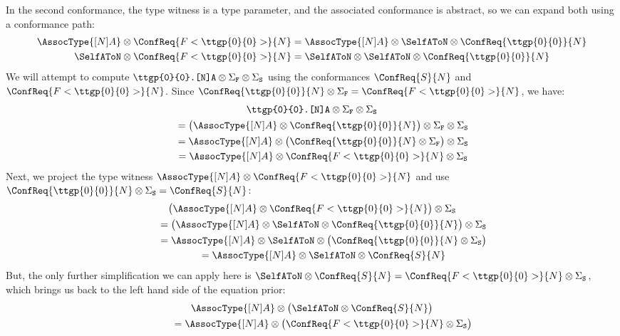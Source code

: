 \documentclass[../generics]{subfiles}
\begin{document}
In the second conformance, the type witness is a type parameter, and the associated conformance is abstract, so we can expand both using a conformance path:
\begin{gather*}
\AssocType{[N]A} \otimes \ConfReq{F<\ttgp{0}{0}>}{N} = \AssocType{[N]A} \otimes \SelfAToN \otimes \ConfReq{\ttgp{0}{0}}{N}\\
\SelfAToN \otimes \ConfReq{F<\ttgp{0}{0}>}{N} = \SelfAToN \otimes \SelfAToN \otimes \ConfReq{\ttgp{0}{0}}{N}
\end{gather*}
We will attempt to compute $\texttt{\ttgp{0}{0}.[N]A}\otimes \Sigma_\texttt{F}\otimes\Sigma_\texttt{S}$ using the conformances $\ConfReq{S}{N}$ and $\ConfReq{F<\ttgp{0}{0}>}{N}$. Since $\ConfReq{\ttgp{0}{0}}{N} \otimes \Sigma_\texttt{F}=\ConfReq{F<\ttgp{0}{0}>}{N}$, we have:
\begin{gather*}
\texttt{\ttgp{0}{0}.[N]A} \otimes \Sigma_\texttt{F}\otimes\Sigma_\texttt{S} \\
\qquad {} = \bigl( \AssocType{[N]A} \otimes \ConfReq{\ttgp{0}{0}}{N} \bigr) \otimes \Sigma_\texttt{F}\otimes\Sigma_\texttt{S}\\
\qquad {} = \AssocType{[N]A} \otimes \bigl( \ConfReq{\ttgp{0}{0}}{N} \otimes \Sigma_\texttt{F} \bigr)\otimes\Sigma_\texttt{S}\\
\qquad {} = \AssocType{[N]A} \otimes \ConfReq{F<\ttgp{0}{0}>}{N} \otimes \Sigma_\texttt{S}
\end{gather*}
Next, we project the type witness $\AssocType{[N]A}\otimes\ConfReq{F<\ttgp{0}{0}>}{N}$ and use $\ConfReq{\ttgp{0}{0}}{N} \otimes \Sigma_\texttt{S}=\ConfReq{S}{N}$:
\begin{gather*}
\bigl( \AssocType{[N]A} \otimes \ConfReq{F<\ttgp{0}{0}>}{N}\bigr)\otimes\Sigma_\texttt{S}\\
\qquad {} = \bigl( \AssocType{[N]A} \otimes \SelfAToN \otimes \ConfReq{\ttgp{0}{0}}{N} \bigr) \otimes \Sigma_\texttt{S}\\
\qquad {} = \AssocType{[N]A} \otimes \SelfAToN \otimes \bigl( \ConfReq{\ttgp{0}{0}}{N} \otimes \Sigma_\texttt{S} \bigr)\\
\qquad {} = \AssocType{[N]A} \otimes \SelfAToN \otimes \ConfReq{S}{N}
\end{gather*}
But, the only further simplification we can apply here is $\SelfAToN \otimes \ConfReq{S}{N}=\ConfReq{F<\ttgp{0}{0}>}{N} \otimes \Sigma_\texttt{S}$, which brings us back to the left hand side of the equation prior:
\begin{gather*}
\AssocType{[N]A} \otimes \bigl( \SelfAToN \otimes \ConfReq{S}{N} \bigr) \\
\qquad {} = \AssocType{[N]A} \otimes \bigl( \ConfReq{F<\ttgp{0}{0}>}{N} \otimes \Sigma_\texttt{S} \bigr)
\end{gather*}
\end{document}
